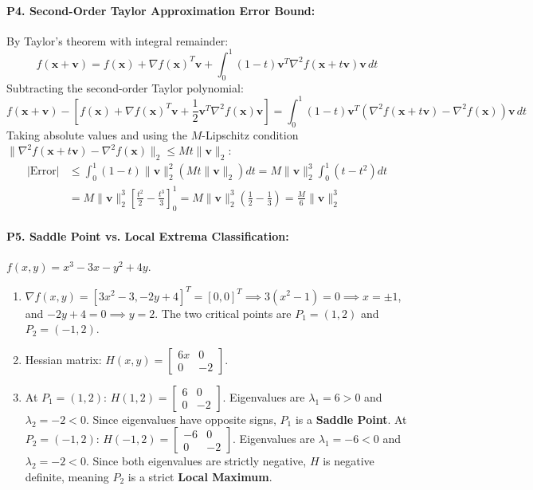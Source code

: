 \paragraph{P4. Second-Order Taylor Approximation Error Bound:}
By Taylor's theorem with integral remainder:
\begin{equation*}
f(\mathbf{x} + \mathbf{v}) = f(\mathbf{x}) + \nabla f(\mathbf{x})^T \mathbf{v} + \int_0^1 (1 - t) \mathbf{v}^T \nabla^2 f(\mathbf{x} + t\mathbf{v}) \mathbf{v} \, dt
\end{equation*}
Subtracting the second-order Taylor polynomial:
\begin{equation*}
f(\mathbf{x} + \mathbf{v}) - \left[ f(\mathbf{x}) + \nabla f(\mathbf{x})^T \mathbf{v} + \frac{1}{2}\mathbf{v}^T \nabla^2 f(\mathbf{x})\mathbf{v} \right] = \int_0^1 (1 - t) \mathbf{v}^T \left( \nabla^2 f(\mathbf{x} + t\mathbf{v}) - \nabla^2 f(\mathbf{x}) \right) \mathbf{v} \, dt
\end{equation*}
Taking absolute values and using the $M$-Lipschitz condition $\|\nabla^2 f(\mathbf{x} + t\mathbf{v}) - \nabla^2 f(\mathbf{x})\|_2 \le M t \|\mathbf{v}\|_2$:
\begin{align*}
|\text{Error}| &\le \int_0^1 (1 - t) \|\mathbf{v}\|_2^2 \left( M t \|\mathbf{v}\|_2 \right) dt = M \|\mathbf{v}\|_2^3 \int_0^1 (t - t^2) dt \\
&= M \|\mathbf{v}\|_2^3 \left[ \frac{t^2}{2} - \frac{t^3}{3} \right]_0^1 = M \|\mathbf{v}\|_2^3 \left( \frac{1}{2} - \frac{1}{3} \right) = \frac{M}{6}\|\mathbf{v}\|_2^3
\end{align*}

\paragraph{P5. Saddle Point vs. Local Extrema Classification:}
$f(x, y) = x^3 - 3x - y^2 + 4y$.
\begin{enumerate}[label=(\alph*)]
    \item $\nabla f(x, y) = [3x^2 - 3, -2y + 4]^T = [0, 0]^T \implies 3(x^2 - 1) = 0 \implies x = \pm 1$, and $-2y + 4 = 0 \implies y = 2$.
    The two critical points are $P_1 = (1, 2)$ and $P_2 = (-1, 2)$.
    \item Hessian matrix: $H(x, y) = \begin{bmatrix} 6x & 0 \\ 0 & -2 \end{bmatrix}$.
    \item At $P_1 = (1, 2)$: $H(1, 2) = \begin{bmatrix} 6 & 0 \\ 0 & -2 \end{bmatrix}$. Eigenvalues are $\lambda_1 = 6 > 0$ and $\lambda_2 = -2 < 0$. Since eigenvalues have opposite signs, $P_1$ is a \textbf{Saddle Point}.
    At $P_2 = (-1, 2)$: $H(-1, 2) = \begin{bmatrix} -6 & 0 \\ 0 & -2 \end{bmatrix}$. Eigenvalues are $\lambda_1 = -6 < 0$ and $\lambda_2 = -2 < 0$. Since both eigenvalues are strictly negative, $H$ is negative definite, meaning $P_2$ is a strict \textbf{Local Maximum}.
\end{enumerate}

